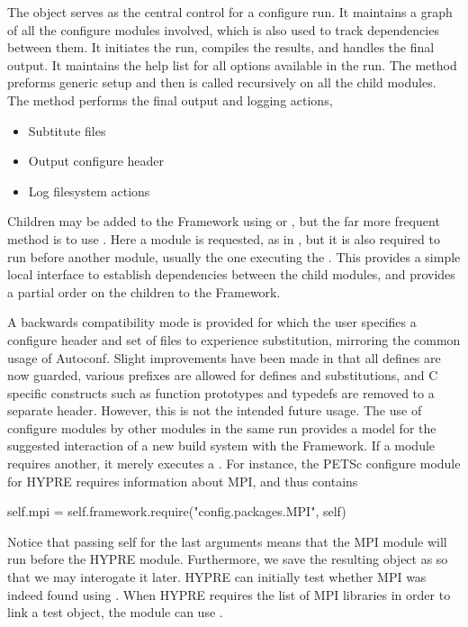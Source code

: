 {{{The  object serves as the central control for a configure run. It maintains a graph of all the configure modules involved, which is also used to track dependencies between them. It initiates the run, compiles the results, and handles the final output. It maintains the help list for all options available in the run. The  method preforms generic  setup and then is called recursively on all the child modules. The  method performs the final output and logging actions,
\begin{itemize}
  \item Subtitute files
  \item Output configure header
  \item Log filesystem actions
\end{itemize}
Children may be added to the Framework using  or , but the far more frequent method is to use . Here a module is requested, as in , but it is also required to run before another module, usually the one executing the . This provides a simple local interface to establish dependencies between the child modules, and provides a partial order on the children to the Framework.

A backwards compatibility mode is provided for which the user specifies a configure header and set of files to experience substitution, mirroring the common usage of Autoconf. Slight improvements have been made in that all defines are now guarded, various prefixes are allowed for defines and substitutions, and C specific constructs such as function prototypes and typedefs are removed to a separate header. However, this is not the intended future usage. The use of configure modules by other modules in the same run provides a model for the suggested interaction of a new build system with the Framework. If a module requires another, it merely executes a . For instance, the PETSc configure module for HYPRE requires information about MPI, and thus contains
\begin{pythonlisting}
    self.mpi = self.framework.require("config.packages.MPI", self)
\end{pythonlisting}
Notice that passing self for the last arguments means that the MPI module will run before the HYPRE module. Furthermore, we save the resulting object as  so that we may interogate it later. HYPRE can initially test whether MPI was indeed found using . When HYPRE requires the list of MPI libraries in order to link a test object, the module can use .

}}}
